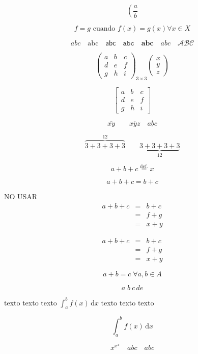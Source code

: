 \documentclass[12pt,a4paper]{report}
\numberwithin{equation}{section}
\begin{document}
$$
\left(\frac{a}{b}\right.
$$

$$
f=g \mbox{ cuando } f(x)=g(x) \forall x\in X
$$

$$
abc\quad \mathrm{abc}\quad\mathsf{abc}\quad\mathtt{abc}\quad\mathbf{abc}\quad\mathit{abc}\quad\mathcal{ABC}
$$



$$
\left(\begin{array}{ccc}
 a & b & c \\
 d & e & f \\
 g & h & i
\end{array}\right)_{3\times 3} \left(\begin{array}{c}
x \\
y \\
z
\end{array}\right)
$$

$$
\left[\begin{array}{ccc}
a & b & c \\
d & e & f \\
g & h & i
\end{array}\right]
$$

$$
\bar{xy}\qquad \overline{xyz}\quad\underline{abc}
$$

$$
\overbrace{3+3+3+3}^{12}\qquad\underbrace{3+3+3+3}_{12}
$$

$$
a+b+c\stackrel{\mathrm{def.}}{=} x
$$

\begin{equation}
a+b+c=b+c
\end{equation}

NO USAR
\begin{eqnarray}
a+b+c & = & b+c \\
      & = & f+g \\
      & = & x+y
\end{eqnarray}

\begin{eqnarray*}
a+b+c & = & b+c \\
& = & f+g \\
& = & x+y
\end{eqnarray*}

$$
a+b=c\;\forall a,b\in A
$$

$$
a\; b\:c\,d\!e
$$

texto texto texto $\displaystyle\int_a^b f(x)\,\mathrm{d}x$ texto texto texto

$$\textstyle\int_a^b f(x)\,\mathrm{d}x$$

$$
x^{x^x} \quad \scriptscriptstyle{abc}\quad \scriptstyle{abc}
$$
\end{document}
